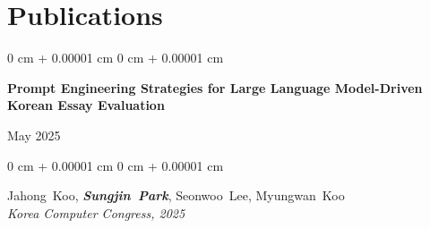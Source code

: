 \documentclass[10pt, letterpaper]{article}
\newenvironment{highlights}{
    \begin{itemize}[
        topsep=0.10 cm,
        parsep=0.10 cm,
        partopsep=0pt,
        itemsep=0pt,
        leftmargin=0 cm + 10pt
    ]
}{
    \end{itemize}
} %
\newenvironment{onecolentry}{
    \begin{adjustwidth}{
        0 cm + 0.00001 cm
    }{
        0 cm + 0.00001 cm
    }
}{
    \end{adjustwidth}
} %
\newenvironment{twocolentry}[2][]{
    \onecolentry
    \def\secondColumn{#2}
    \setcolumnwidth{\fill, 4.5 cm}
    \begin{paracol}{2}
}{
    \switchcolumn \raggedleft \secondColumn
    \end{paracol}
    \endonecolentry
} %
\begin{document}




    
    \section{Publications}
            \begin{twocolentry}{
                May 2025
            }
                \textbf{Prompt Engineering Strategies for Large Language Model-Driven Korean Essay Evaluation}
            \end{twocolentry}

            \vspace{0.10 cm}
            
            \begin{onecolentry}
                \mbox{Jahong Koo}, \mbox{\textbf{\textit{Sungjin Park}}}, \mbox{Seonwoo Lee}, \mbox{Myungwan Koo}
                \vspace{0.10 cm} \\
                \textit{Korea Computer Congress, 2025}
            \end{onecolentry}
            \vspace{0.2 cm}
\end{document}
